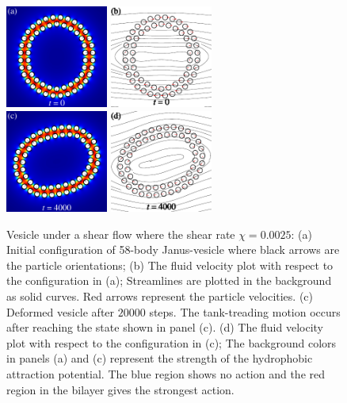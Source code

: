 \documentclass[lineno]{jfm}
\begin{document}
\begin{figure}
\centering
\includegraphics[width=0.3\textwidth]{N58_0.pdf}
\includegraphics[width=0.3\textwidth]{N58_vel_0.pdf}\\
\includegraphics[width=0.3\textwidth]{N58_20000.pdf}
\includegraphics[width=0.3\textwidth]{N58_vel_20000.pdf}
  \caption{Vesicle under a shear flow where the shear rate $\chi=0.0025$: 
  (a) Initial configuration of 58-body Janus-vesicle where black arrows are the particle orientations; 
  (b) The fluid velocity plot with respect to the configuration in (a); Streamlines are plotted in the background
  as solid curves. Red arrows represent the particle velocities.
  (c) Deformed vesicle after $20000$ steps. The tank-treading motion occurs after reaching the state shown in panel (c).
  (d) The fluid velocity plot with respect to the configuration in (c);
  The background colors in panels (a) and (c) represent the strength of the hydrophobic attraction potential. The blue region shows no action and the red region in the bilayer gives the strongest action.
  }
    \label{figure3}
\end{figure}
%
%
\end{document}
